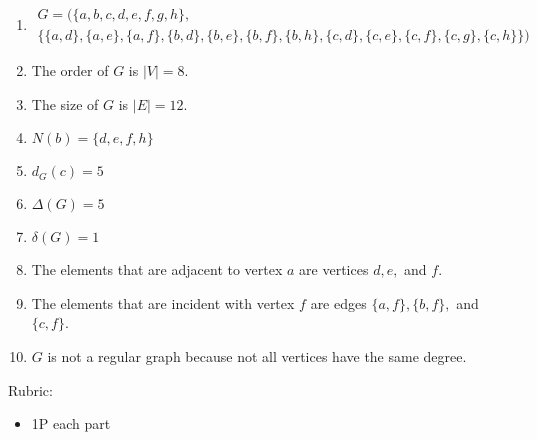 \documentclass{article}
\theoremstyle{definition}
\begin{document}
\begin{solution}
\begin{enumerate}
	\item \begin{multline*}
	G=(\{a, b, c, d, e, f, g, h\}, \\ \{\{a, d\}, \{a, e\}, \{a, f\}, \{b, d\}, \{b, e\}, \{b, f\}, \{b, h\}, \{c, d\}, \{c, e\}, \{c, f\}, \{c, g\}, \{c, h\}\})
	\end{multline*}
	\item The order of $G$ is $|V|=8$.
	\item The size of $G$ is $|E|=12$.
	\item $N(b) = \{d, e, f, h\}$
	\item $d_G(c)=5$
	\item $\Delta(G)=5$
	\item $\delta(G)=1$
	\item The elements that are adjacent to vertex $a$ are vertices $d, e,$ and $f$.
	\item The elements that are incident with vertex $f$ are edges $\{a, f\}, \{b, f\},$ and $\{c, f\}$.
	\item $G$ is not a regular graph because not all vertices have the same degree.
\end{enumerate}

{\color{red} Rubric:
\begin{itemize}
\item 1P each part
\end{itemize}}
\end{solution}
\end{document}
